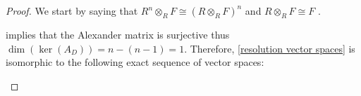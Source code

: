\begin{proof} 
  We start by saying that $R^n\otimes_R F\cong (R\otimes_R F)^n$ and $R\otimes_R F\cong F$ \cite[Proposition~2.14]{atiyah}.

    implies that the Alexander matrix is surjective thus $\dim(\ker(A_D))=n-(n-1)=1$. Therefore, \eqref{resolution vector spaces} is isomorphic to the following exact sequence of vector spaces:
   \begin{center}
   \end{center}

\end{proof}
